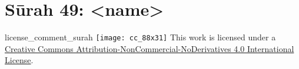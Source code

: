 \begin{comment}
The following strings are to be replaced by a script, in order to use this file as a template (all upper case):-
* sNO = sūrah number, without leading zeros
* sZO = sūrah number, with leading zeros
\end{comment}
\begin{comment}
The following tags are declared here:-
license_comment_surah
\end{comment}
\section{Sūrah 49: <name>}
\END

\begin{taggedblock}{license_comment_surah}
\texttt{[image: cc\_88x31]}
This work is licensed under a 
\href{http://creativecommons.org/licenses/by-nc-nd/4.0/}{Creative Commons Attribution-NonCommercial-NoDerivatives 4.0 International License}.
\end{taggedblock}